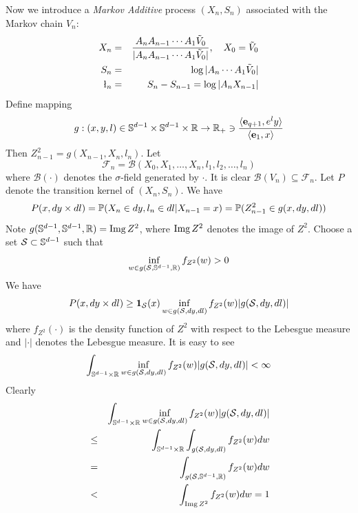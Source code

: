 \documentclass[aoas,preprint]{imsart}
\numberwithin{equation}{section}
\theoremstyle{plain}
\begin{document}

Now we introduce a {\em Markov Additive} process $(X_n, S_n)$
associated with the Markov chain $V_n$:
\begin{eqnarray*}
X_n &=& {
        A_n A_{n-1} \cdots A_1 \tilde V_0
        \over
        |A_n A_{n-1} \cdots A_1 \tilde V_0|
      }, \quad X_0 = \tilde V_0\\
S_n &=& \log |A_n \cdots A_1 \tilde V_0| \\
\l_n &=& S_n - S_{n-1} = \log |A_n X_{n-1}|
\end{eqnarray*}
Define mapping
\[
g: (x, y, l) \in \sphere^{d-1} \times \sphere^{d-1} \times \reals
\to
\reals_+ \ni {
  \inn{\vec e_{q+1}, e^l y}
  \over
  \inn{\vec e_{1}, x}
}
\]
Then $Z_{n-1}^2 = g(X_{n-1}, X_n, l_n)$. Let
\[
\mathscr F_n = \mathcal B(X_0, X_1, \dots, X_n, l_1, l_2, \dots, l_n)
\]
where $\mathcal B(\cdot)$ denotes the $\sigma$-field generated by
$\cdot$. It is clear $\mathcal B(V_n) \subseteq \mathscr F_n$.
Let $P$ denote the transition kernel of $(X_n, S_n)$. We have
\[
  P(x, dy \times dl) = \P(X_n \in dy, l_n \in dl | X_{n-1} = x)
  = \P(Z_{n-1}^2 \in g(x, dy, dl))
  \]
Note $g(\sphere^{d-1}, \sphere^{d-1}, \reals) = \img Z^2$,
where $\img Z^2$ denotes the image of $Z^2$.
Choose a set $\mathcal S \subset \sphere^{d-1}$ such that
\[
\inf_{w \in g(\mathcal S, \sphere^{d-1}, \reals)} f_{Z^2}(w) > 0
\]
We have
\begin{eqnarray*}
  P(x, dy \times dl) \geq
  \I_{\mathcal S}(x) \inf_{w \in g(\mathcal S, dy, dl)} f_{Z^2}(w)
  | g(\mathcal S, dy, dl)| 
\end{eqnarray*}
where $f_{Z^2}(\cdot)$ is the density function of $Z^2$ with respect to the
Lebesgue measure and $|\cdot|$ denotes the Lebesgue measure. It is
easy to see
\[
\int_{\sphere^{d-1} \times \reals} \inf_{w \in g(\mathcal S, dy, dl)} f_{Z^2}(w)
| g(\mathcal S, dy, dl)| < \infty
\]
Clearly
\begin{eqnarray*}
  &&
  \int_{\sphere^{d-1} \times \reals} \inf_{w \in g(\mathcal S, dy, dl)} f_{Z^2}(w)
  | g(\mathcal S, dy, dl)| \\
  &\leq&
  \int_{\sphere^{d-1} \times \reals}
  \int_{g(\mathcal S, dy, dl)} f_{Z^2}(w) dw \\
  &=&
  \int_{g(\mathcal S, \sphere^{d-1}, \reals)} f_{Z^2}(w) dw \\
  &<&
  \int_{\img Z^2} f_{Z^2}(w) dw = 1
\end{eqnarray*}
\end{document}
